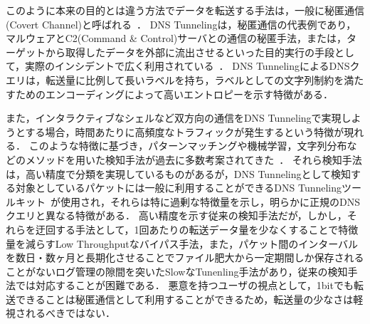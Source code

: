 このように本来の目的とは違う方法でデータを転送する手法は，一般に秘匿通信(Covert Channel)と呼ばれる~\cite{covertchannel}．
DNS Tunnelingは，秘匿通信の代表例であり，マルウェアとC2(Command \& Control)サーバとの通信の秘匿手法，または，ターゲットから取得したデータを外部に流出させるといった目的実行の手段として，実際のインシデントで広く利用されている~\cite{frameworkpos, bondupdater, bernhardpos, multigrainpos, pisloader, denis, dnsmessenger, udpos}．
DNS TunnelingによるDNSクエリは，転送量に比例して長いラベルを持ち，ラベルとしての文字列制約を満たすためのエンコーディングによって高いエントロピーを示す特徴がある．


また，インタラクティブなシェルなど双方向の通信をDNS Tunnelingで実現しようとする場合，時間あたりに高頻度なトラフィックが発生するという特徴が現れる．
このような特徴に基づき，パターンマッチングや機械学習，文字列分布などのメソッドを用いた検知手法が過去に多数考案されてきた~\cite{born, cheng, liu, asaf, steadman, jawad}．
それら検知手法は，高い精度で分類を実現しているものがあるが，DNS Tunnelingとして検知する対象としているパケットには一般に利用することができるDNS Tunnelingツールキット~\cite{ozymandns, iodine, dnscat2}が使用され，それらは特に過剰な特徴量を示し，明らかに正規のDNSクエリと異なる特徴がある．
高い精度を示す従来の検知手法だが，しかし，それらを迂回する手法として，1回あたりの転送データ量を少なくすることで特徴量を減らすLow Throughputなバイパス手法，また，パケット間のインターバルを数日・数ヶ月と長期化させることでファイル肥大から一定期間しか保存されることがないログ管理の隙間を突いたSlowなTunenling手法があり，従来の検知手法では対応することが困難である．
悪意を持つユーザの視点として，1bitでも転送できることは秘匿通信として利用することができるため，転送量の少なさは軽視されるべきではない．

